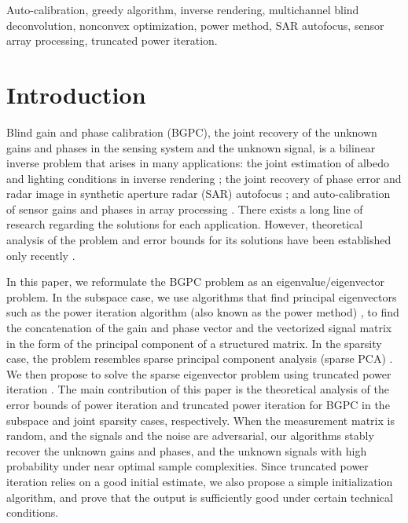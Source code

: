 \documentclass[11pt,journal]{IEEEtran}
\begin{document}
\begin{IEEEkeywords}
Auto-calibration, greedy algorithm, inverse rendering, multichannel blind deconvolution, nonconvex optimization, power method, SAR autofocus, sensor array processing, truncated power iteration.
\end{IEEEkeywords}




\IEEEpeerreviewmaketitle



\section{Introduction}
Blind gain and phase calibration (BGPC), the joint recovery of the unknown gains and phases in the sensing system and the unknown signal, is a bilinear inverse problem that arises in many applications: the joint estimation of albedo and lighting conditions in inverse rendering \cite{Nguyen2013}; the joint recovery of phase error and radar image in synthetic aperture radar (SAR) autofocus \cite{Morrison2009}; and auto-calibration of sensor gains and phases in array processing \cite{Paulraj1985}. 
There exists a long line of research regarding the solutions for each application. However, theoretical analysis of the problem and error bounds for its solutions have been established only recently \cite{Li2015,Li2015e,Ling2016,Wang2016}.


In this paper, we reformulate the BGPC problem as an eigenvalue/eigenvector problem. In the subspace case, we use algorithms that find principal eigenvectors such as the power iteration algorithm (also known as the power method) \cite[Section 8.2.1]{Golub1996}, to find  the concatenation of the gain and phase vector and the vectorized signal matrix in the form of the principal component of a structured matrix. In the sparsity case, the problem resembles sparse principal component analysis (sparse PCA) \cite{Moghaddam2006}. We then propose to solve the sparse eigenvector problem using truncated power iteration \cite{Yuan2013}.
The main contribution of this paper is the theoretical analysis of the error bounds of power iteration and truncated power iteration for BGPC in the subspace and joint sparsity cases, respectively. When the measurement matrix is random, and the signals and the noise are adversarial, our algorithms stably recover the unknown gains and phases, and the unknown signals with high probability under near optimal sample complexities. Since truncated power iteration relies on a good initial estimate, we also propose a simple initialization algorithm, and prove that the output is sufficiently good under certain technical conditions.
\end{document}

